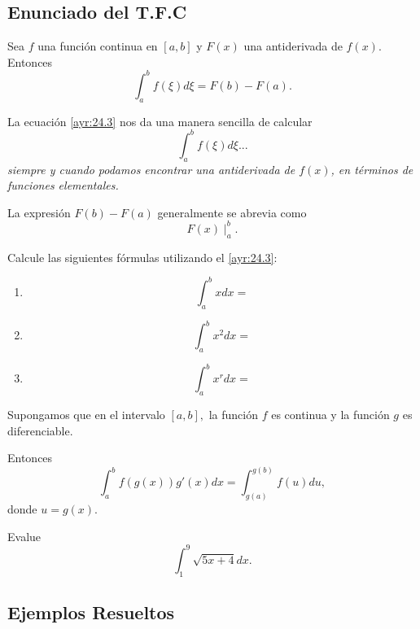 \subsection{Enunciado del T.F.C}


 \begin{teorema}
  Sea $f$ una función continua en $[a,b]$ y
  $F(x)$ una antiderivada de $f(x).$ Entonces
  \[
   \label{ayr:24.3}
   \tag{TFC}
   \int_{a}^{b}f(\xi)d\xi=F(b)-F(a).
  \]

 \end{teorema}




 La ecuación \eqref{ayr:24.3} nos da una manera sencilla de calcular $$\int_{a}^{b}f(\xi)d\xi...$$ \emph{siempre y cuando podamos encontrar una antiderivada de $f(x)$, en términos de funciones elementales.}



 La expresión $F(b)-F(a)$ generalmente se abrevia como $$F(x)\mid_{a}^{b}.$$



 Calcule las siguientes fórmulas utilizando el \eqref{ayr:24.3}:
 \begin{enumerate}
  \item $$\int_{a}^{b}x dx=$$
  \item $$\int_{a}^{b}x^{2} dx=$$
  \item $$\int_{a}^{b}x^{r} dx=$$
 \end{enumerate}




 \begin{proposicion}
 Supongamos que en el intervalo $[a,b],$ la función $f$ es continua y la función $g$ es diferenciable.

 Entonces{\color{blue}
  $$
  \int_{a}^{b}f(g(x))g'(x)dx=
  \int_{g(a)}^{g(b)}f(u)du,
  $$}
donde {\color{green}$u=g(x).$}
 \end{proposicion}




 \begin{resuelto}
  \label{ayr:exmp:24.2}
  Evalue $$
  \int_{1}^{9}\sqrt{5x+4}dx.
  $$
 \end{resuelto}



\subsection{Ejemplos Resueltos}


